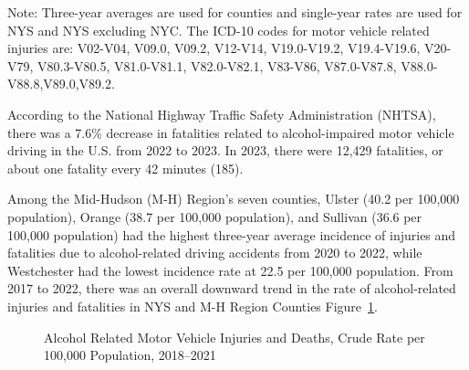 \documentclass[
  english,
  letterpaper,
]{report}
\begin{document}
\begin{tcolorbox}[enhanced jigsaw, breakable, leftrule=.75mm, title=\textcolor{quarto-callout-note-color}{\faInfo}\hspace{0.5em}{Note}, bottomrule=.15mm, opacityback=0, left=2mm, colback=white, bottomtitle=1mm, coltitle=black, colbacktitle=quarto-callout-note-color!10!white, colframe=quarto-callout-note-color-frame, opacitybacktitle=0.6, toptitle=1mm, titlerule=0mm, arc=.35mm, rightrule=.15mm, toprule=.15mm]

Note: Three-year averages are used for counties and single-year rates
are used for NYS and NYS excluding NYC. The ICD-10 codes for motor
vehicle related injuries are: V02-V04, V09.0, V09.2, V12-V14,
V19.0-V19.2, V19.4-V19.6, V20-V79, V80.3-V80.5, V81.0-V81.1,
V82.0-V82.1, V83-V86, V87.0-V87.8, V88.0-V88.8,V89.0,V89.2.

\end{tcolorbox}

According to the National Highway Traffic Safety Administration (NHTSA),
there was a 7.6\% decrease in fatalities related to alcohol-impaired
motor vehicle driving in the U.S. from 2022 to 2023. In 2023, there were
12,429 fatalities, or about one fatality every 42 minutes (185).

Among the Mid-Hudson (M-H) Region's seven counties, Ulster (40.2 per
100,000 population), Orange (38.7 per 100,000 population), and Sullivan
(36.6 per 100,000 population) had the highest three-year average
incidence of injuries and fatalities due to alcohol-related driving
accidents from 2020 to 2022, while Westchester had the lowest incidence
rate at 22.5 per 100,000 population. From 2017 to 2022, there was an
overall downward trend in the rate of alcohol-related injuries and
fatalities in NYS and M-H Region Counties
Figure~\ref{fig-mva-alcohol-injury-death-crude}.

\begin{figure}


\caption{\label{fig-mva-alcohol-injury-death-crude}Alcohol Related Motor
Vehicle Injuries and Deaths, Crude Rate per 100,000 Population,
2018--2021}

\end{figure}%
\end{document}
